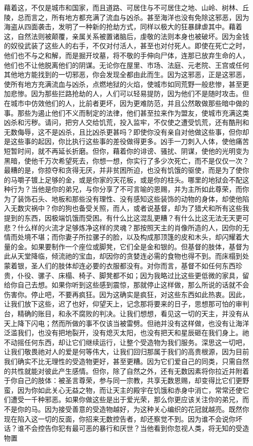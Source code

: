 藉着这，不仅是城市和国家，而且道路、可居住与不可居住之地、山岭、树林、丘陵，总而言之，所有地方都充满了流血与凶杀。甚至海洋也没有免除这邪恶，因为海盗从四面袭击，发明了一种新的抢劫方式，同样以极大的狂暴肆虐其中。藉着这，自然法则被颠覆，亲属关系被置诸脑后，虔敬的法则本身也被破坏。因为金钱的奴役武装了这些人的右手，不仅对付活人，甚至也对付死人。即使在死亡之时，他们也不与之和解，而是掘开坟墓，将不敬的手伸向尸体，连那已放弃生命的人，他们也不让他脱离他们的阴谋。无论你在屋里、市场、法庭、元老院、王宫或任何其他地方能找到的一切邪恶，你会发现全都由此而生。因为这邪恶，正是这邪恶，使所有地方充满流血与凶杀，点燃地狱的火焰，使城市如同荒野一般悲惨，甚至更加悲惨。因为那些拦路抢劫的人，人们可以轻易提防，因为他们不是随时攻击。但在城市中仿效他们的人，比前者更坏，因为更难防范，并且公然敢做那些暗中做的事。那些为遏止他们不义而制定的法律，他们甚至拉来作为盟友，使城市充满这类凶杀和污秽。请问，把穷人交给饥荒，投入监牢，不仅使之遭受饥荒，还有酷刑和无数侮辱，这不是凶杀，且比凶杀更甚吗？即使你没有亲自对他做这些事，但你却是这些事的起因，你比执行这些事的差役做得更多。凶手一刀刺入人体，使他痛苦短暂时间，就不再延长折磨。但你，藉着你的诽谤、骚扰、阴谋，使他的光明变为黑暗，使他千万次希望死去，你想一想，你实行了多少次死亡，而不是仅仅一次？最糟的是，你掠夺和贪得无厌，并非贫困所迫，也没有饥饿的驱使，而是为了使你的马嚼子镀上足够的金，或是你家的天花板，或是你的柱头。哪里的地狱会不配这种行为？当他是你的弟兄，与你分享了不可言喻的恩赐，并为主所如此尊荣，而你为了装饰石头、地板和那些没有理性、没有感知这些装饰的动物的身体，却使他陷入无数灾祸中？你的狗也备受关照，而人，或者说基督，却为了猎犬和所有这些我提到的东西，因极端饥饿而受困。有什么比这混乱更糟？有什么比这无法无天更可悲？什么样的火流才足够炼净这样的灵魂？那按照天主的肖像所造的人，因你的无情而处境不堪；而你妻子所拉骡子的脸，以及构成那顶篷的皮和木头，却闪耀着大量的金。如果要制作一个座位或脚凳，它们全是金和银的。但基督的肢体，基督为此从天堂降临，倾流祂的宝血，却因你的贪婪连必需的食物也得不到。而床榻到处蒙着银，圣人们的肢体却连必要的衣服都没有。对你而言，基督不如任何东西珍贵，仆役、骡子、床榻、椅子、脚凳都不如；因为我略过比这些更低微的家具，留给你自己去想。如果你听到这些感到震惊，那就停止这样做，那么所说的话就不会伤害你。停止吧，不要再疯狂。因为这确实是疯狂，对这些东西如此热衷。因此，让我们放下这些，迟了也好，仰望天上，记念那将要来的日子，思想那可怕的审判台，精确的账目，和永不腐败的判决。让我们想想，看见这一切的天主，并没有从天上降下闪电；然而所做的事不仅该当被雷劈。但祂并没有这样做，也没有让海洋泛滥我们，也没有把地裂开，没有熄灭太阳，也没有把天和星辰砸在我们身上。祂不动摇任何东西，却让它们继续运行，让整个受造物为我们服务。深思这一切吧，让我们敬畏祂对人的爱是何等伟大，让我们回归那属于我们的高贵根源，因为目前我们确实不比无理性的受造物更好，甚至更糟。因为它们爱自己的同类，只需自然的共性就能对彼此产生感情。但你，除了自然之外，还有无数因素将你拉近并附着于你自己的肢体：被圣言尊荣，参与同一宗教，共享无数恩赐，却变得比它们更野蛮，因为你如此关心无益之物，而让天主的殿宇在饥饿和赤身中消亡，常常还使它们遭受一千种邪恶。如果你做这些是出于爱光荣，那么你更应该关注你的弟兄，而不是你的马。因为接受善意的受造物越好，为这种关心编织的花冠就越亮。既然你现在陷入这一切的反面，你招来无数控告者，却还察觉不到。因为谁不会说你坏话？谁不会控告你犯有最可恶的暴行和厌世？当他看到你忽视人类，将无知的受造物置